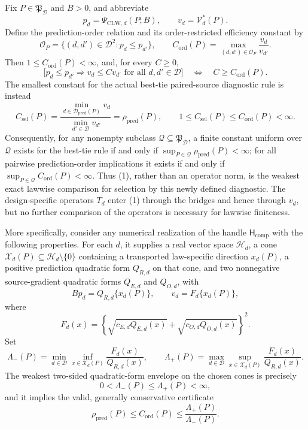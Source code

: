 Fix \(P\in\mathfrak P_{\mathcal D}\) and \(B>0\), and abbreviate
\[
 p_d=\Psi_{\mathrm{CLW},d}(P;B),
 \qquad
 v_d=\mathcal V_d^*(P).
\]
Define the prediction-order relation and its order-restricted efficiency constant by
\[
 \mathcal O_P
 =\{(d,d')\in\mathcal D^2:p_d\le p_{d'}\},
 \qquad
 C_{\mathrm{ord}}(P)
 =\max_{(d,d')\in\mathcal O_P}\frac{v_d}{v_{d'}}.
 \tag{1}
\]
Then \(1\le C_{\mathrm{ord}}(P)<\infty\), and, for every \(C\ge0\),
\[
 \bigl[p_d\le p_{d'}\Longrightarrow v_d\le C v_{d'}
 \text{ for all }d,d'\in\mathcal D\bigr]
 \quad\Longleftrightarrow\quad
 C\ge C_{\mathrm{ord}}(P).
 \tag{2}
\]
The smallest constant for the actual best-tie paired-source diagnostic rule is instead
\[
 C_{\mathrm{sel}}(P)
 =\frac{\min_{d\in\mathcal D_{\mathrm{pred}}(P)}v_d}
 {\min_{d'\in\mathcal D}v_{d'}}
 =\rho_{\mathrm{pred}}(P),
 \qquad
 1\le C_{\mathrm{sel}}(P)\le C_{\mathrm{ord}}(P)<\infty.
 \tag{3}
\]
Consequently, for any nonempty subclass \(\mathcal Q\subseteq\mathfrak P_{\mathcal D}\), a finite constant uniform over \(\mathcal Q\) exists for the best-tie rule if and only if
\(\sup_{P\in\mathcal Q}\rho_{\mathrm{pred}}(P)<\infty\); for all pairwise prediction-order implications it exists if and only if
\(\sup_{P\in\mathcal Q}C_{\mathrm{ord}}(P)<\infty\).  Thus (1), rather than an operator norm, is the weakest exact lawwise comparison for selection by this newly defined diagnostic.  The design-specific operators \(T_d\) enter (1) through the bridges and hence through \(v_d\), but no further comparison of the operators is necessary for lawwise finiteness.

More specifically, consider any numerical realization of the handle \(\mathsf H_{\mathrm{comp}}\) with the following properties.  For each \(d\), it supplies a real vector space \(\mathcal H_d\), a cone \(\mathcal X_d(P)\subseteq\mathcal H_d\setminus\{0\}\) containing a transported law-specific direction \(x_d(P)\), a positive prediction quadratic form \(Q_{R,d}\) on that cone, and two nonnegative source-gradient quadratic forms \(Q_{E,d}\) and \(Q_{O,d}\), with
\[
 Bp_d=Q_{R,d}\{x_d(P)\},
 \qquad
 v_d=F_d\{x_d(P)\},
 \tag{4}
\]
where
\[
 F_d(x)
 =\left\{
 \sqrt{c_{E,d}Q_{E,d}(x)}
 +\sqrt{c_{O,d}Q_{O,d}(x)}
 \right\}^2.
 \tag{5}
\]
Set
\[
 \Lambda_-(P)
 =\min_{d\in\mathcal D}\inf_{x\in\mathcal X_d(P)}
 \frac{F_d(x)}{Q_{R,d}(x)},
 \qquad
 \Lambda_+(P)
 =\max_{d\in\mathcal D}\sup_{x\in\mathcal X_d(P)}
 \frac{F_d(x)}{Q_{R,d}(x)}.
 \tag{6}
\]
The weakest two-sided quadratic-form envelope on the chosen cones is precisely
\[
 0<\Lambda_-(P)\le\Lambda_+(P)<\infty,
 \tag{7}
\]
and it implies the valid, generally conservative certificate
\[
 \rho_{\mathrm{pred}}(P)
 \le C_{\mathrm{ord}}(P)
 \le\frac{\Lambda_+(P)}{\Lambda_-(P)}.
 \tag{8}
\]

